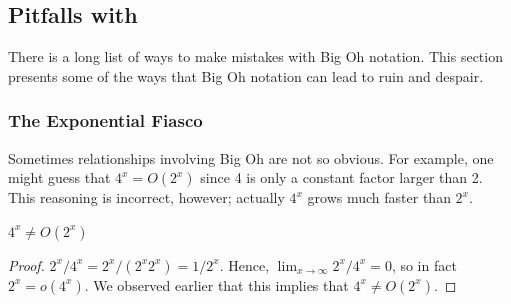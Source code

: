 \subsection{Pitfalls with }

There is a long list of ways to make mistakes with Big Oh notation.
This section presents some of the ways that Big Oh notation can lead
to ruin and despair.

\subsubsection{The Exponential Fiasco}

Sometimes relationships involving Big Oh are not so obvious.  For
example, one might guess that $4^x = O(2^x)$ since 4 is only a
constant factor larger than 2.  This reasoning is incorrect,
however; actually $4^x$ grows much faster than $2^x$.

\begin{proposition}
$4^x \neq O(2^x)$
\end{proposition}

\begin{proof}
$2^x/4^x = 2^x/(2^x2^x) = 1/2^x$.  Hence, $\lim_{x \rightarrow \infty}
2^x/4^x = 0$, so in fact $2^x = o(4^x)$.  We observed earlier that this
implies that $4^x \neq O(2^x)$.
\end{proof}

